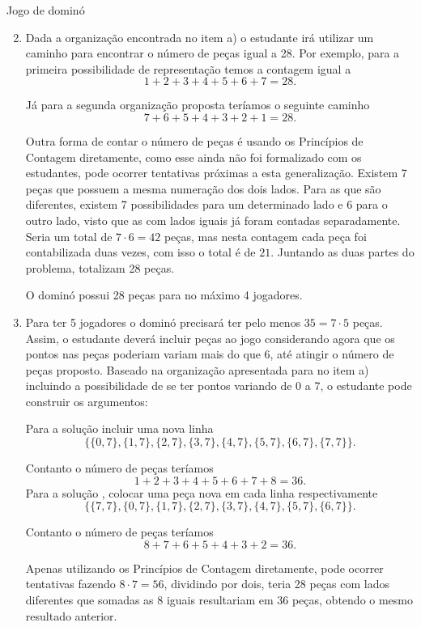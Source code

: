 \begin{answer}{Jogo de dominó}
{
\begin{enumerate}\setcounter{enumi}{1}
\item Dada a organização encontrada no item a) o  estudante irá utilizar um caminho para encontrar o número de peças igual a 28. Por exemplo, para a primeira possibilidade de representação temos a contagem  igual a 
\[1+2+3+4+5+6+7=28. \] 

Já para a segunda organização proposta teríamos o seguinte caminho   
\[7+6+5+4+3+2+1=28. \] 

Outra forma de contar o número de peças é usando os Princípios de Contagem diretamente, como esse ainda não foi formalizado com os estudantes, pode ocorrer tentativas próximas a esta generalização. Existem 7 peças que possuem a mesma numeração dos dois lados. Para as que são diferentes, existem 7 possibilidades para um determinado lado e 6 para o outro lado, visto que as com lados iguais já foram contadas separadamente. Seria um total de $7\cdot 6=42$ peças, mas nesta contagem cada peça foi contabilizada duas vezes, com isso o total é de $21$. Juntando as duas partes do problema, totalizam 28 peças.

O dominó possui 28 peças para no máximo 4 jogadores.   

\item Para ter 5 jogadores o dominó precisará ter pelo menos $35=7 \cdot 5$ peças. Assim, o estudante deverá incluir peças ao jogo considerando agora que os pontos nas peças poderiam variam mais do que 6, até atingir o número de peças proposto.
Baseado na organização apresentada para no item a) incluindo a possibilidade de se ter pontos variando de 0 a 7, o estudante pode construir os argumentos:

Para a solução   incluir uma nova linha
$$\{\{0,7\}, \{1,7\}, \{2,7\}, \{3,7\}, \{4,7\}, \{5,7\}, \{6,7\}, \{7,7\}\}.$$

Contanto o número de peças teríamos  
\[1+2+3+4+5+6+7+8=36. \] 
Para a solução , colocar uma peça nova em cada linha respectivamente $$\{\{7,7\}, \{0,7\}, \{1,7\}, \{2,7\}, \{3,7\}, \{4,7\}, \{5,7\}, \{6,7\}\}.$$ 

Contanto o número de peças teríamos  \[8+7+6+5+4+3+2=36. \] 

Apenas utilizando os Princípios de Contagem diretamente, pode ocorrer tentativas fazendo $8\cdot 7=56$, dividindo por dois, teria 28 peças com lados diferentes que somadas as 8 iguais resultariam em 36 peças, obtendo o mesmo resultado anterior.


\end{enumerate}}
\end{answer}
